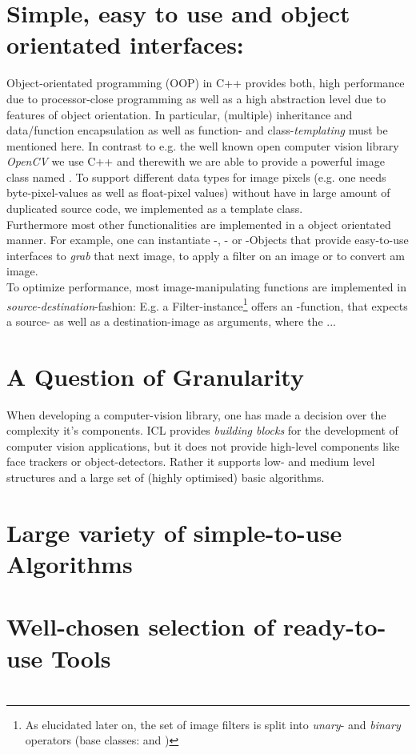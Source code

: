 \section{Simple, easy to use and object orientated interfaces:}
Object-orientated programming (OOP) in C++ provides both, high performance due to processor-close programming as well as a high abstraction level due to features of object orientation. In particular, (multiple) inheritance and data/function encapsulation as well as function- and class-\emph{templating} must be mentioned here. In contrast to e.g. the well known open computer vision library \emph{OpenCV} we use C++ and therewith we are able to provide a powerful image class named . To support different data types for image pixels (e.g. one needs byte-pixel-values as well as float-pixel values) without have in large amount of duplicated source code, we implemented  as a template class.\\
Furthermore most other functionalities are implemented in a object orientated manner. For example, one can instantiate  -, - or -Objects that provide easy-to-use interfaces to \emph{grab} that next image, to apply a filter on an image or to convert am image.\\
To optimize performance, most image-manipulating functions are implemented in \emph{source-destination}-fashion: E.g. a Filter-instance\footnote{As elucidated later on, the set of image filters is split into \emph{unary}- and \emph{binary} operators (base classes:  and )} offers an -function, that expects a source- as well as a destination-image as arguments, where the ...  

\section{A Question of Granularity}
When developing a computer-vision library, one has made a decision over the complexity it's components. ICL provides \emph{building blocks} for the development of computer vision applications, but it does not provide high-level components like face trackers or object-detectors. Rather it supports low- and medium level structures and a large set of (highly optimised) basic algorithms.


\section{Large variety of simple-to-use Algorithms}

\section{Well-chosen selection of ready-to-use Tools}

\section{} 